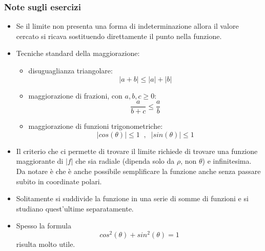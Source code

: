 \subsubsection*{Note sugli esercizi}
\begin{itemize}
    \item Se il limite non presenta una forma di indeterminazione allora il valore cercato si ricava sostituendo direttamente il punto nella funzione.
    \item Tecniche standard della maggiorazione: 
        \begin{itemize}
            \item disuguaglianza triangolare:
                \[
                    |a+b| \leq |a| + |b|
                \]
            \item maggiorazione di frazioni, con $a,b,c \geq 0$:
                \[
                    \frac{a}{b+c} \leq \frac{a}{b}
                \]
            \item maggiorazione di funzioni trigonometriche:
                \[
                    |cos(\theta)| \leq 1 \;\;,\;\;|sin(\theta)|\leq 1
                \]
        \end{itemize}
    \item Il criterio che ci permette di trovare il limite richiede di trovare una funzione maggiorante di $|f|$ che sia radiale (dipenda solo da $\rho$, non $\theta$) e infinitesima. Da notare è che è anche possibile semplificare la funzione anche senza passare subito in coordinate polari.
    \item Solitamente si suddivide la funzione in una serie di somme di funzioni e si studiano quest'ultime separatamente.
    \item Spesso la formula
        \[
            cos^2(\theta) + sin^2(\theta) = 1
        \]
        risulta molto utile.
\end{itemize}








